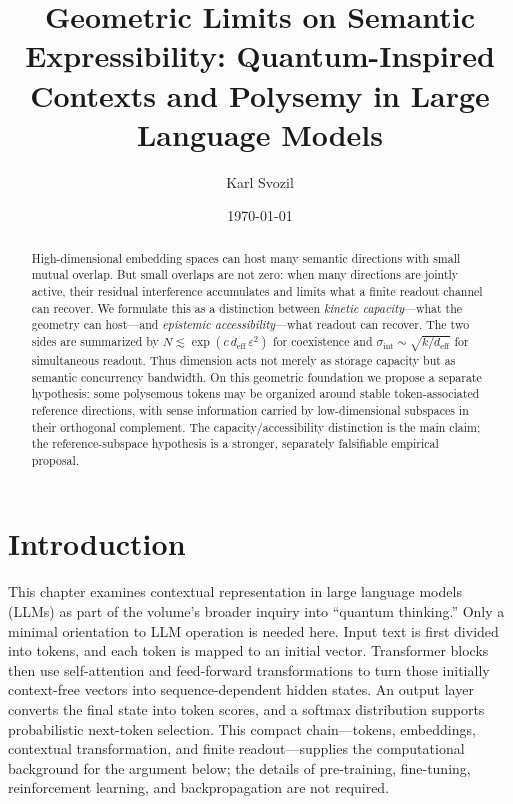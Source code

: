 \documentclass[
  aps,
  reprint,
  superscriptaddress,
  floatfix,
  nofootinbib,
  longbibliography
]{revtex4-2}
\newcommand{\deff}{d_{\mathrm{eff}}}
\newcommand{\sint}{\sigma_{\mathrm{int}}}
\begin{document}
\title{Geometric Limits on Semantic Expressibility: Quantum-Inspired Contexts and Polysemy in Large Language Models}

\author{Karl Svozil}

\date{\today}

\begin{abstract}
High-dimensional embedding spaces can host many semantic directions
with small mutual overlap. But small overlaps are not zero: when many
directions are jointly active, their residual interference accumulates
and limits what a finite readout channel can recover. We formulate this
as a distinction between \emph{kinetic capacity}---what the geometry
can host---and \emph{epistemic accessibility}---what readout can
recover. The two sides are summarized by
$N\lesssim\exp(c\,\deff\,\varepsilon^{2})$ for coexistence and
$\sint\sim\sqrt{k/\deff}$ for simultaneous readout. Thus dimension acts
not merely as storage capacity but as semantic concurrency bandwidth.
On this geometric foundation we propose a separate hypothesis: some
polysemous tokens may be organized around stable token-associated
reference directions, with sense information carried by low-dimensional
subspaces in their orthogonal complement. The capacity/accessibility
distinction is the main claim; the reference-subspace hypothesis is a stronger,
separately falsifiable empirical proposal.
\end{abstract}

\maketitle


\section{Introduction}
\label{sec:intro}

This chapter examines contextual representation in large language models
(LLMs) as part of the volume's broader inquiry into ``quantum thinking.''
Only a minimal orientation to LLM operation is needed here.  Input text is
first divided into tokens, and each token is mapped to an initial vector.
Transformer blocks then use self-attention and feed-forward transformations
to turn those initially context-free vectors into sequence-dependent hidden
states.  An output layer converts the final state into token scores, and a
softmax distribution supports probabilistic next-token selection.  This
compact chain---tokens, embeddings, contextual transformation, and finite
readout---supplies the computational background for the argument below; the
details of pre-training, fine-tuning, reinforcement learning, and
backpropagation are not required.
\end{document}
